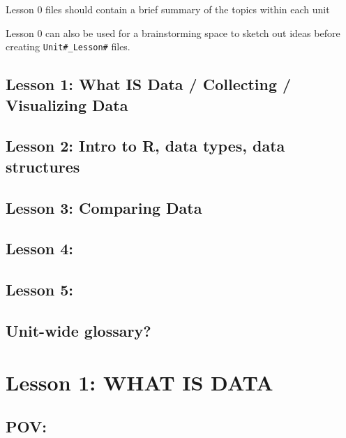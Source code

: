 \documentclass[
]{book}
\begin{document}
Lesson 0 files should contain a brief summary of the topics within each unit

Lesson 0 can also be used for a brainstorming space to sketch out ideas before creating \texttt{Unit\#\_Lesson\#} files.

\hypertarget{lesson-1-what-is-data-collecting-visualizing-data}{%
\section{Lesson 1: What IS Data / Collecting / Visualizing Data}\label{lesson-1-what-is-data-collecting-visualizing-data}}

\hypertarget{lesson-2-intro-to-r-data-types-data-structures}{%
\section{Lesson 2: Intro to R, data types, data structures}\label{lesson-2-intro-to-r-data-types-data-structures}}

\hypertarget{lesson-3-comparing-data}{%
\section{Lesson 3: Comparing Data}\label{lesson-3-comparing-data}}

\hypertarget{lesson-4}{%
\section{Lesson 4:}\label{lesson-4}}

\hypertarget{lesson-5}{%
\section{Lesson 5:}\label{lesson-5}}

\hypertarget{unit-wide-glossary}{%
\section*{Unit-wide glossary?}\label{unit-wide-glossary}}

\hypertarget{lesson-1-what-is-data}{%
\chapter{Lesson 1: WHAT IS DATA}\label{lesson-1-what-is-data}}

\hypertarget{pov}{%
\section{POV:}\label{pov}}
\end{document}
